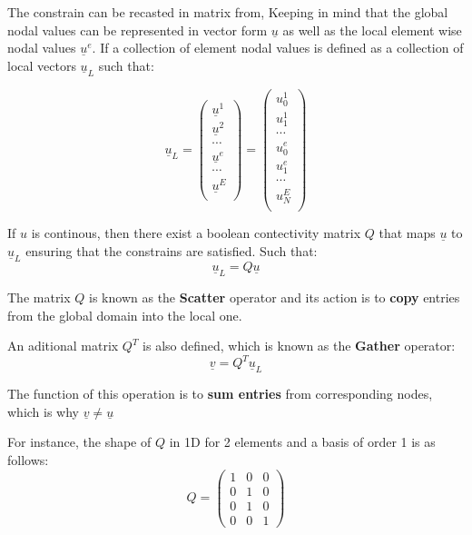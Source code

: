 \documentclass[
]{scrartcl}
\begin{document}
The constrain can be recasted in matrix from, Keeping in mind that the
global nodal values can be represented in vector form \(\underline{u}\)
as well as the local element wise nodal values \(\underline{u}^{e}\). If
a collection of element nodal values is defined as a collection of local
vectors \(\underline{u}_L\) such that:

\begin{equation}
    \underline{u}_L=
    \begin{pmatrix}
    \underline{u}^{1} \\
    \underline{u}^{2} \\
    \cdots \\
    \underline{u}^{e} \\
    \cdots \\
    \underline{u}^{E} \\
    \end{pmatrix}= 
    \begin{pmatrix}
    {u}^{1}_{0} \\
    {u}^{1}_{1} \\
    \cdots \\
    {u}^{e}_{0} \\
    {u}^{e}_{1} \\
    \cdots \\
    {u}^{E}_{N} \\
    \end{pmatrix}
\end{equation}

If \(u\) is continous, then there exist a boolean contectivity matrix
\(Q\) that maps \(\underline{u}\) to \(\underline{u}_L\) ensuring that
the constrains are satisfied. Such that: \begin{equation}
    \underline{u}_L=Q\underline{u}
\end{equation}

The matrix \(Q\) is known as the \textbf{Scatter} operator and its
action is to \textbf{copy} entries from the global domain into the local
one.

An aditional matrix \(Q^{T}\) is also defined, which is known as the
\textbf{Gather} operator: \begin{equation}
    \underline{v}=Q^{T}\underline{u}_L
\end{equation}

The function of this operation is to \textbf{sum entries} from
corresponding nodes, which is why \(\underline{v} \neq \underline{u}\)

For instance, the shape of \(Q\) in 1D for 2 elements and a basis of
order 1 is as follows: \begin{equation}
    Q=
    \begin{pmatrix}
           1    &   0     &0 \\
           0    &    1    & 0\\
            0  &   1     & 0\\
            0   &    0    & 1
    \end{pmatrix} 
\end{equation}
\end{document}
